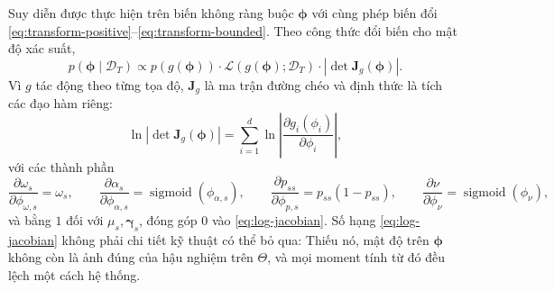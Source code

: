 \documentclass[12pt,a4paper]{article}
\numberwithin{equation}{section}
\theoremstyle{definition}
\newcommand{\sigmoid}{\operatorname{sigmoid}}
\newcommand{\Data}{\mathcal{D}}
\newcommand{\bmgamma}{\symbf{\gamma}}
\newcommand{\vecphi}{\symbf{\phi}}
\begin{document}
	Suy diễn được thực hiện trên biến không ràng buộc $\vecphi$ với cùng phép biến đổi
	\eqref{eq:transform-positive}--\eqref{eq:transform-bounded}. Theo công thức đổi biến cho
	mật độ xác suất,
	\begin{equation}
		p\!\left(\vecphi \mid \Data_T\right) \propto 
		p\!\left(g(\vecphi)\right) \cdot \mathcal{L}\!\left(g(\vecphi); \Data_T\right) \cdot \left|\det\symbf{J}_g(\vecphi)\right|.
		\label{eq:posterior-unconstrained}
	\end{equation}
	Vì $g$ tác động theo từng tọa độ, $\symbf J_g$ là ma trận đường chéo và định thức là tích
	các đạo hàm riêng:
	\begin{equation}
		\ln\left|\det\symbf J_g(\vecphi)\right|
		=\sum_{i=1}^{d}\ln\left|\frac{\partial g_i(\phi_i)}{\partial\phi_i}\right|,
		\label{eq:log-jacobian}
	\end{equation}
	với các thành phần
	\begin{equation}
		\frac{\partial\omega_s}{\partial\phi_{\omega,s}}=\omega_s,\qquad
		\frac{\partial\alpha_s}{\partial\phi_{\alpha,s}}=\sigmoid(\phi_{\alpha,s}),\qquad
		\frac{\partial p_{ss}}{\partial\phi_{p,s}}=p_{ss}\left(1-p_{ss}\right),\qquad
		\frac{\partial\nu}{\partial\phi_{\nu}}=\sigmoid(\phi_{\nu}),
		\label{eq:jacobian-terms}
	\end{equation}
	và bằng $1$ đối với $\mu_s,\bmgamma_s$, đóng góp $0$ vào \eqref{eq:log-jacobian}. Số hạng
	\eqref{eq:log-jacobian} không phải chi tiết kỹ thuật có thể bỏ qua: Thiếu nó, mật độ trên
	$\vecphi$ không còn là ảnh đúng của hậu nghiệm trên $\Theta$, và mọi moment tính từ đó
	đều lệch một cách hệ thống.
	
\end{document}
